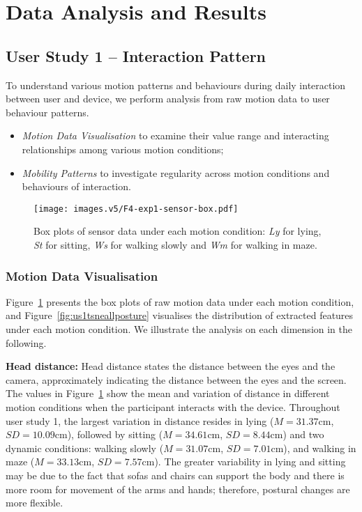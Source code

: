 \section{Data Analysis and Results}\label{sec:results}

\subsection{User Study 1 -- Interaction Pattern}
To understand various motion patterns and behaviours during daily interaction between user and device, we perform analysis from raw motion data to user behaviour patterns.

\begin{itemize}
    \item \textit{Motion Data Visualisation} to examine their value range and interacting relationships among various motion conditions; 
    \item \textit{Mobility Patterns} to investigate regularity across motion conditions and behaviours of interaction. 
\end{itemize}


\begin{figure}[!htbp]
    \centering
    \texttt{[image: images.v5/F4-exp1-sensor-box.pdf]}
    \caption{Box plots of sensor data under each motion condition: \textit{Ly} for lying, \textit{St}  for sitting, \textit{Ws} for walking slowly and \textit{Wm} for walking in maze. }
    \label{fig:overall-US1-sensor-data}
\end{figure}


\subsubsection{Motion Data Visualisation}\label{subsec:visualisemotiondata}
Figure~\ref{fig:overall-US1-sensor-data} presents the box plots of raw motion data under each motion condition, and Figure~\ref{fig:us1tsneallposture} visualises the distribution of extracted features under each motion condition. We illustrate the analysis on each dimension in the following. 


\noindent\textbf{Head distance:} Head distance states the distance between the eyes and the camera, approximately indicating the distance between the eyes and the screen. The values in Figure~\ref{fig:overall-US1-sensor-data} show the mean and variation of distance in different motion conditions when the participant interacts with the device. Throughout user study 1, the largest variation in distance resides in lying ($M=31.37$cm, $SD=10.09$cm), followed by sitting ($M=34.61$cm, $SD=8.44$cm) and two dynamic conditions: walking slowly ($M=31.07$cm, $SD=7.01$cm), and walking in maze ($M=33.13$cm, $SD=7.57$cm). The greater variability in lying and sitting may be due to the fact that sofas and chairs can support the body and there is more room for movement of the arms and hands; therefore, postural changes are more flexible.


